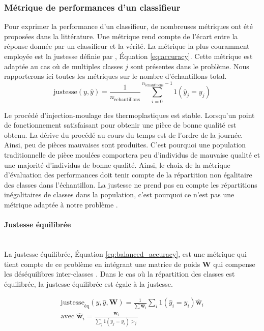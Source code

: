 \subsubsection{Métrique de performances d'un classifieur}
Pour exprimer la performance d'un classifieur, de nombreuses métriques ont été proposées dans la littérature.
Une métrique rend compte de l'écart entre la réponse donnée par un classifieur et la vérité.
La métrique la plus couramment employée est la justesse définie par \citeauthor{metz_basic_1978} \cite{metz_basic_1978}, Équation \ref{eq:accuracy}.
Cette métrique est adaptée au cas où de multiples classes $j$ sont présentes dans le problème.
Nous rapporterons ici toutes les métriques sur le nombre d'échantillons total.
\begin{equation} \label{eq:accuracy}
\text{justesse}(y, \hat{y})=\frac{1}{n_{\mathrm{\acute{e}chantillons}}} \sum_{i=0}^{n_{\mathrm{\acute{e}chantillons}}-1} 1\left(\hat{y}_{j}=y_{j}\right)
\end{equation}

Le procédé d'injection-moulage des thermoplastiques est stable.
Lorsqu'un point de fonctionnement satisfaisant pour obtenir une pièce de bonne qualité est obtenu.
La dérive du procédé au cours du temps est de l'ordre de la journée.
Ainsi, peu de pièces mauvaises sont produites.
C'est pourquoi une population traditionnelle de pièce moulées comportera peu d'individus de mauvaise qualité et une majorité d'individus de bonne qualité.
Ainsi, le choix de la métrique d'évaluation des performances doit tenir compte de la répartition non égalitaire des classes dans l'échantillon.
La justesse ne prend pas en compte les répartitions inégalitaires de classes dans la population, c'est pourquoi ce n'est pas une métrique adaptée à notre problème \cite{japkowicz_class_2002}.

\paragraph{Justesse équilibrée}\mbox{} \\
La justesse équilibrée, Équation \ref{eq:balanced_accuracy}, est une métrique qui tient compte de ce problème en intégrant une matrice de poids $\mathbf{W}$ qui compense les déséquilibres inter-classes \cite{brodersen_balanced_2010, mosley_balanced_2013}.
Dans le cas où la répartition des classes est équilibrée, la justesse équilibrée est égale à la justesse.

\begin{equation} \label{eq:balanced_accuracy}
\begin{split}
\text{justesse}_{\text{éq}}(y, \hat{y}, \mathbf{W})=\frac{1}{\sum \hat{\mathbf{w}}_{i}} \sum_{i} 1\left(\hat{y}_{i}=y_{i}\right) \hat{\mathbf{w}}_{i}
\\
\text{avec } \hat{\mathbf{w}}_{i}=\frac{\mathbf{w}_{i}}{\sum_{j} 1\left(y_{j}=y_{i}\right) >_{j}}
\end{split}
\end{equation}

